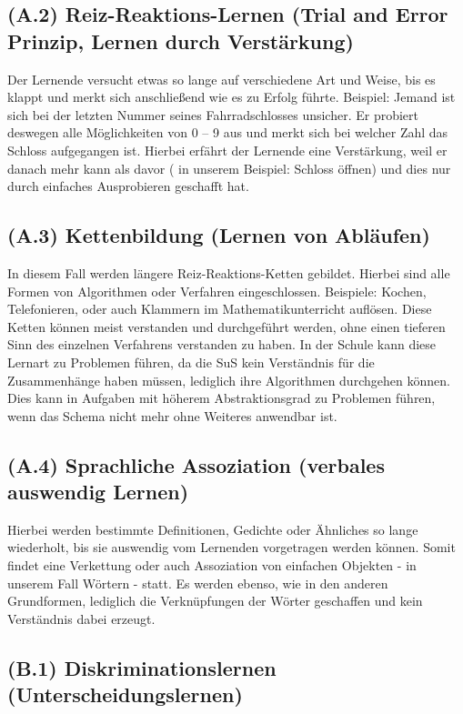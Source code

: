 \subsection[]{(A.2) Reiz-Reaktions-Lernen (Trial and Error Prinzip, Lernen durch Verstärkung)}

Der Lernende versucht etwas so lange auf verschiedene Art und Weise, bis es klappt und merkt sich anschließend wie es zu Erfolg führte. 
Beispiel: Jemand ist sich bei der letzten Nummer seines Fahrradschlosses unsicher. Er probiert deswegen  alle Möglichkeiten von 0 – 9 aus und merkt sich bei welcher Zahl das Schloss aufgegangen ist. Hierbei erfährt der Lernende eine Verstärkung, weil er danach mehr kann als davor ( in unserem Beispiel: Schloss öffnen) und dies nur durch einfaches Ausprobieren geschafft hat\cite{zech1983grundkurs}.

\subsection[]{(A.3) Kettenbildung (Lernen von Abläufen)}

In diesem Fall werden längere Reiz-Reaktions-Ketten gebildet. Hierbei sind alle Formen von Algorithmen oder Verfahren eingeschlossen. Beispiele: Kochen, Telefonieren, oder auch Klammern im Mathematikunterricht auflösen. Diese Ketten können meist verstanden und durchgeführt werden, ohne einen tieferen Sinn des einzelnen Verfahrens verstanden zu haben. In der Schule kann diese Lernart zu Problemen führen, da die \gls{SuS} kein Verständnis für die Zusammenhänge haben müssen, lediglich ihre Algorithmen durchgehen können. Dies kann in Aufgaben mit höherem Abstraktionsgrad zu Problemen führen, wenn das Schema nicht mehr ohne Weiteres anwendbar ist.

\subsection[]{(A.4) Sprachliche Assoziation (verbales auswendig Lernen)}

Hierbei werden bestimmte Definitionen, Gedichte oder Ähnliches so lange wiederholt, bis sie auswendig vom Lernenden vorgetragen werden können. Somit findet eine Verkettung oder auch Assoziation von einfachen Objekten - in unserem Fall Wörtern - statt. Es werden ebenso, wie in den anderen Grundformen, lediglich die Verknüpfungen der Wörter geschaffen und kein Verständnis dabei erzeugt\cite{zech1983grundkurs}. 

\subsection[]{(B.1) Diskriminationslernen (Unterscheidungslernen)}

